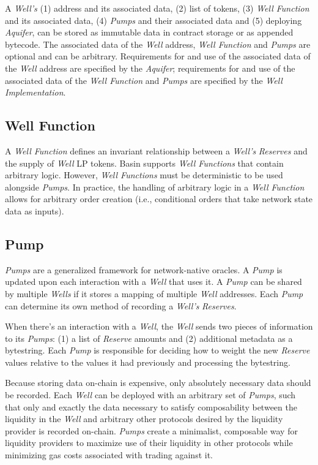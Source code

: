 \documentclass[tikz]{article}
\newcommand{\term}[1]{\textsl{#1}}
\begin{document}
A \term{Well's} (1) address and its associated data, (2) list of tokens, (3) \term{Well Function} and its associated data, (4) \term{Pumps} and their associated data and (5) deploying \term{Aquifer}, can be stored as immutable data in contract storage or as appended bytecode. The associated data of the \term{Well} address, \term{Well Function} and \term{Pumps} are optional and can be arbitrary. Requirements for and use of the associated data of the \term{Well} address are specified by the \term{Aquifer}; requirements for and use of the associated data of the \term{Well Function} and \term{Pumps} are specified by the \term{Well Implementation}. 

\subsection{Well Function}
\vspace*{-0.1cm}
A \term{Well Function} defines an invariant relationship between a \term{Well's} \term{Reserves} and the supply of \term{Well} LP tokens. Basin supports \term{Well Functions} that contain arbitrary logic. However, \term{Well Functions} must be deterministic to be used alongside \term{Pumps}. In practice, the handling of arbitrary logic in a \term{Well Function} allows for arbitrary order creation (i.e., conditional orders that take network state data as inputs).

\subsection{Pump}
\vspace*{-0.1cm}
\term{Pumps} are a generalized framework for network-native oracles. A \term{Pump} is updated upon each interaction with a \term{Well} that uses it. A \term{Pump} can be shared by multiple \term{Wells} if it stores a mapping of multiple \term{Well} addresses. Each \term{Pump} can determine its own method of recording a \term{Well's} \term{Reserves}. 

When there’s an interaction with a \term{Well}, the \term{Well} sends two pieces of information to its \term{Pumps}: (1) a list of \term{Reserve} amounts and (2) additional metadata as a bytestring. Each \term{Pump} is responsible for deciding how to weight the new \term{Reserve} values relative to the values it had previously and processing the bytestring. 

Because storing data on-chain is expensive, only absolutely necessary data should be recorded. Each \term{Well} can be deployed with an arbitrary set of \term{Pumps}, such that only and exactly the data necessary to satisfy composability between the liquidity in the \term{Well} and arbitrary other protocols desired by the liquidity provider is recorded on-chain. \term{Pumps} create a minimalist, composable way for liquidity providers to maximize use of their liquidity in other protocols while minimizing gas costs associated with trading against it.
\end{document}
